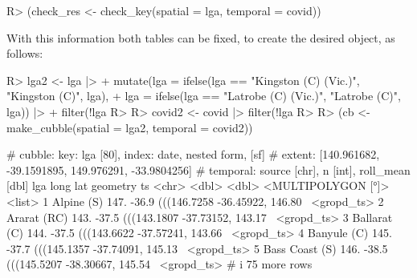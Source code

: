 \documentclass[
  shortnames]{jss}
\begin{document}
\begin{CodeChunk}
\begin{CodeInput}
R> (check_res <- check_key(spatial = lga, temporal = covid))
\end{CodeInput}
\end{CodeChunk}

With this information both tables can be fixed, to create the desired  object, as follows:

\begin{CodeChunk}
\begin{CodeInput}
R> lga2 <- lga |>
+   mutate(lga = ifelse(lga == "Kingston (C) (Vic.)", "Kingston (C)", lga),
+          lga = ifelse(lga == "Latrobe (C) (Vic.)", "Latrobe (C)", lga)) |>
+   filter(!lga %
R> 
R> covid2 <- covid |> filter(!lga %
R> 
R> (cb <- make_cubble(spatial = lga2, temporal = covid2))
\end{CodeInput}
\begin{CodeOutput}
# cubble:   key: lga [80], index: date, nested form, [sf]
# extent:   [140.961682, -39.1591895, 149.976291, -33.9804256]
# temporal: source [chr], n [int], roll_mean [dbl]
  lga             long   lat                       geometry ts        
  <chr>          <dbl> <dbl>             <MULTIPOLYGON [°]> <list>    
1 Alpine (S)      147. -36.9 (((146.7258 -36.45922, 146.80~ <gropd_ts>
2 Ararat (RC)     143. -37.5 (((143.1807 -37.73152, 143.17~ <gropd_ts>
3 Ballarat (C)    144. -37.5 (((143.6622 -37.57241, 143.66~ <gropd_ts>
4 Banyule (C)     145. -37.7 (((145.1357 -37.74091, 145.13~ <gropd_ts>
5 Bass Coast (S)  146. -38.5 (((145.5207 -38.30667, 145.54~ <gropd_ts>
# i 75 more rows
\end{CodeOutput}
\end{CodeChunk}
\end{document}
